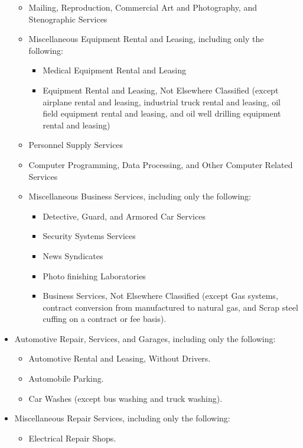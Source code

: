 \begin{itemize}
\begin{itemize}
\item Mailing, Reproduction, Commercial Art and Photography, and Stenographic Services

\item Miscellaneous Equipment Rental and Leasing, including only the following:
\begin{itemize}
\item Medical Equipment Rental and Leasing 

\item Equipment Rental and Leasing, Not Elsewhere Classified (except airplane
rental and leasing, industrial truck rental and leasing, oil field equipment
rental and leasing, and oil well drilling equipment rental and leasing)
\end{itemize}
\item Personnel Supply Services 

\item Computer Programming, Data Processing, and Other Computer Related Services

\item Miscellaneous Business Services, including only the following:
\begin{itemize}
\item Detective, Guard, and Armored Car Services 

\item Security Systems Services

\item News Syndicates 

\item Photo finishing Laboratories 

\item Business Services, Not Elsewhere Classified (except Gas systems, contract
conversion from manufactured to natural gas, and Scrap steel cuffing on a
contract or fee basis).
\end{itemize}
\end{itemize}
\item Automotive Repair, Services, and Garages, including only the following:
\begin{itemize}
\item Automotive Rental and Leasing, Without Drivers.

\item Automobile Parking.

\item Car Washes (except bus washing and truck washing).
\end{itemize}
\item Miscellaneous Repair Services, including only the following:
\begin{itemize}
\item Electrical Repair Shops.


\end{itemize}
\end{itemize}
